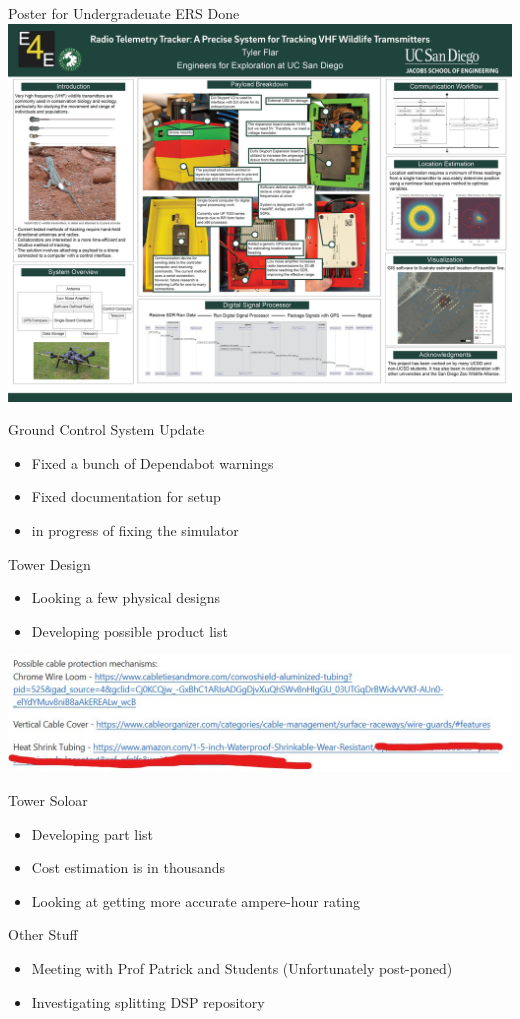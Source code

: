 \begin{frame}{Poster for Undergradeuate ERS Done}
    \centering
    \includegraphics[height=1\textheight,width=1\textwidth,keepaspectratio]{images/rtt/Artboard 1.png}
\end{frame}
\begin{frame}{Ground Control System Update}
    \begin{itemize}
        \item Fixed a bunch of Dependabot warnings
        \item Fixed documentation for setup
        \item in progress of fixing the simulator
    \end{itemize}
\end{frame}
\begin{frame}{Tower Design}
    \begin{itemize}
        \item Looking a few physical designs
        \item Developing possible product list
    \end{itemize}
    \centering
    \includegraphics[height=.7\textheight,width=.7\textwidth,keepaspectratio]{images/rtt/Screenshot 2024-05-24 011542.jpg}
\end{frame}
\begin{frame}{Tower Soloar}
    \begin{itemize}
        \item Developing part list
        \item Cost estimation is in thousands
        \item Looking at getting more accurate ampere-hour rating
    \end{itemize}
\end{frame}
\begin{frame}{Other Stuff}
    \begin{itemize}
        \item Meeting with Prof Patrick and Students (Unfortunately post-poned)
        \item Investigating splitting DSP repository
    \end{itemize}
\end{frame}

